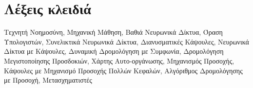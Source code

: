 
\section*{Λέξεις κλειδιά}

\noindent
Τεχνητή Νοημοσύνη, Μηχανική Μάθηση, Βαθιά Νευρωνικά Δίκτυα, Όραση Υπολογιστών, Συνελικτικά Νευρωνικά Δίκτυα, Διανυσματικές Κάψουλες, Νευρωνικά Δίκτυα με Κάψουλες, Δυναμική Δρομολόγηση με Συμφωνία, Δρομολόγηση Μεγιστοποίησης Προσδοκιών, Χάρτης Αυτο-οργάνωσης, Μηχανισμός Προσοχής, Κάψουλες με Μηχανισμό Προσοχής Πολλών Κεφαλών, Αλγόριθμος Δρομολόγησης με Προσοχή, Μετασχηματιστές
